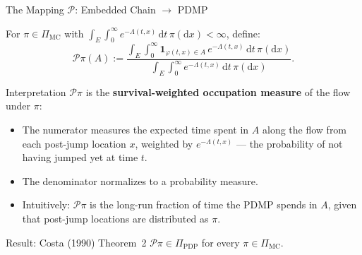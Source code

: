 \begin{frame}{The Mapping $\mathcal{P}$: Embedded Chain $\to$ PDMP}

  \begin{definition}
    For $\pi \in \Pi_{\mathrm{MC}}$ with
    $\int_E \int_0^\infty e^{-\Lambda(t,x)}\,\mathrm{d}t\,\pi(\mathrm{d}x)
    < \infty$, define:
    \[
      \mathcal{P}\pi(A) :=
      \frac{\displaystyle\int_E \int_0^\infty
            \mathbf{1}_{\varphi(t,x)\in A}\,e^{-\Lambda(t,x)}\,
            \mathrm{d}t\,\pi(\mathrm{d}x)}
           {\displaystyle\int_E \int_0^\infty
            e^{-\Lambda(t,x)}\,\mathrm{d}t\,\pi(\mathrm{d}x)}.
    \]
  \end{definition}

  \bigskip
  \begin{block}{Interpretation}
    $\mathcal{P}\pi$ is the \textbf{survival-weighted occupation
    measure} of the flow under $\pi$:
    \begin{itemize}
      \setlength\itemsep{4pt}
      \item The numerator measures the expected time spent in $A$
            along the flow from each post-jump location $x$,
            weighted by $e^{-\Lambda(t,x)}$ --- the probability of
            not having jumped yet at time $t$.
      \item The denominator normalizes to a probability measure.
      \item Intuitively: $\mathcal{P}\pi$ is the long-run fraction
            of time the PDMP spends in $A$, given that post-jump
            locations are distributed as $\pi$.
    \end{itemize}
  \end{block}

  \bigskip
  \begin{block}{Result: Costa (1990) Theorem~2}
    $\mathcal{P}\pi \in \Pi_{\mathrm{PDP}}$ for every
    $\pi \in \Pi_{\mathrm{MC}}$.
  \end{block}

\end{frame}

